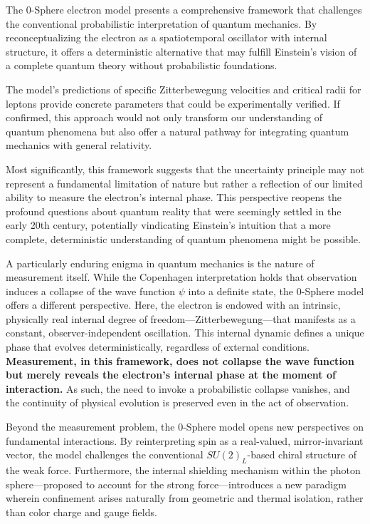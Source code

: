 \documentclass[12pt,letterpaper]{article} %
\begin{document}
The 0-Sphere electron model presents a comprehensive framework that challenges the conventional probabilistic interpretation of quantum mechanics. By reconceptualizing the electron as a spatiotemporal oscillator with internal structure, it offers a deterministic alternative that may fulfill Einstein's vision of a complete quantum theory without probabilistic foundations\cite{einstein1935}.

The model's predictions of specific Zitterbewegung velocities and critical radii for leptons provide concrete parameters that could be experimentally verified. If confirmed, this approach would not only transform our understanding of quantum phenomena but also offer a natural pathway for integrating quantum mechanics with general relativity.

Most significantly, this framework suggests that the uncertainty principle may not represent a fundamental limitation of nature but rather a reflection of our limited ability to measure the electron's internal phase. This perspective reopens the profound questions about quantum reality that were seemingly settled in the early 20th century, potentially vindicating Einstein's intuition that a more complete, deterministic understanding of quantum phenomena might be possible.

A particularly enduring enigma in quantum mechanics is the nature of measurement itself. While the Copenhagen interpretation holds that observation induces a collapse of the wave function $\psi$ into a definite state, the 0-Sphere model offers a different perspective. Here, the electron is endowed with an intrinsic, physically real internal degree of freedom—Zitterbewegung—that manifests as a constant, observer-independent oscillation. This internal dynamic defines a unique phase that evolves deterministically, regardless of external conditions. \textbf{Measurement, in this framework, does not collapse the wave function but merely reveals the electron’s internal phase at the moment of interaction.} As such, the need to invoke a probabilistic collapse vanishes, and the continuity of physical evolution is preserved even in the act of observation.

\medskip

\noindent Beyond the measurement problem, the 0-Sphere model opens new perspectives on fundamental interactions. By reinterpreting spin as a real-valued, mirror-invariant vector, the model challenges the conventional $SU(2)_L$-based chiral structure of the weak force. Furthermore, the internal shielding mechanism within the photon sphere—proposed to account for the strong force—introduces a new paradigm wherein confinement arises naturally from geometric and thermal isolation, rather than color charge and gauge fields.
\end{document}

